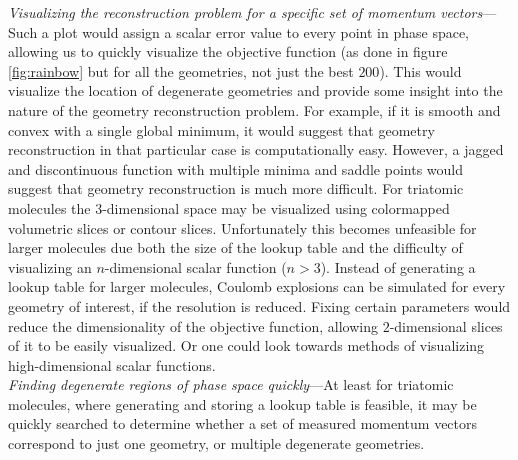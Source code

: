 \noindent
\emph{Visualizing the reconstruction problem for a specific set of momentum vectors}---Such a plot would assign a scalar error value to every point in phase space, allowing us to quickly visualize the objective function (as done in figure \ref{fig:rainbow} but for all the geometries, not just the best $200$). This would visualize the location of degenerate geometries and provide some insight into the nature of the geometry reconstruction problem. For example, if it is smooth and convex with a single global minimum, it would suggest that geometry reconstruction in that particular case is computationally easy. However, a jagged and discontinuous function with multiple minima and saddle points would suggest that geometry reconstruction is much more difficult. For triatomic molecules the $3$-dimensional space may be visualized using colormapped volumetric slices or contour slices. Unfortunately this becomes unfeasible for larger molecules due both the size of the lookup table and the difficulty of visualizing an $n$-dimensional scalar function ($n>3$). Instead of generating a lookup table for larger molecules, Coulomb explosions can be simulated for every geometry of interest, if the resolution is reduced. Fixing certain parameters would reduce the dimensionality of the objective function, allowing $2$-dimensional slices of it to be easily visualized. Or one could look towards methods of visualizing high-dimensional scalar functions. \\

\noindent
\emph{Finding degenerate regions of phase space quickly}---At least for triatomic molecules, where generating and storing a lookup table is feasible, it may be quickly searched to determine whether a set of measured momentum vectors correspond to just one geometry, or multiple degenerate geometries.
